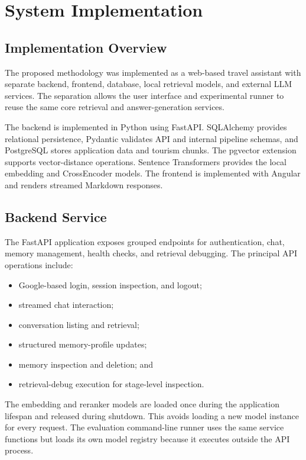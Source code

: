 \chapter{System Implementation}
\label{chap:implementation}

\section{Implementation Overview}

The proposed methodology was implemented as a web-based travel assistant with
separate backend, frontend, database, local retrieval models, and external LLM
services. The separation allows the user interface and experimental runner to
reuse the same core retrieval and answer-generation services.

The backend is implemented in Python using FastAPI. SQLAlchemy provides
relational persistence, Pydantic validates API and internal pipeline schemas,
and PostgreSQL stores application data and tourism chunks. The pgvector
extension supports vector-distance operations. Sentence Transformers provides
the local embedding and CrossEncoder models. The frontend is implemented with
Angular and renders streamed Markdown responses.

\section{Backend Service}

The FastAPI application exposes grouped endpoints for authentication, chat,
memory management, health checks, and retrieval debugging. The principal API
operations include:

\begin{itemize}
    \item Google-based login, session inspection, and logout;
    \item streamed chat interaction;
    \item conversation listing and retrieval;
    \item structured memory-profile updates;
    \item memory inspection and deletion; and
    \item retrieval-debug execution for stage-level inspection.
\end{itemize}

The embedding and reranker models are loaded once during the application
lifespan and released during shutdown. This avoids loading a new model instance
for every request. The evaluation command-line runner uses the same service
functions but loads its own model registry because it executes outside the API
process.

